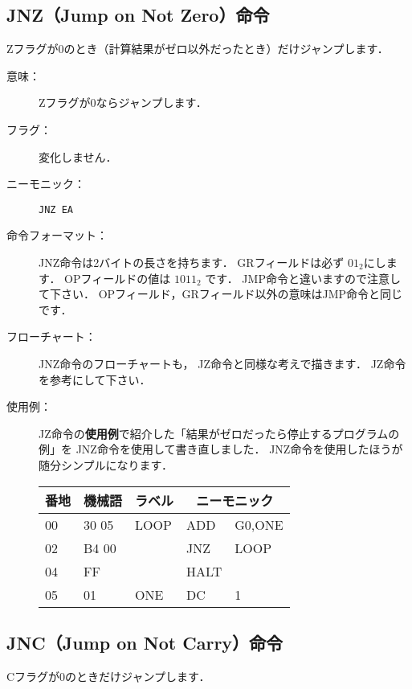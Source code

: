 \subsection{JNZ（Jump on Not Zero）命令}
Zフラグが0のとき（計算結果がゼロ以外だったとき）だけジャンプします．

\begin{description}
\item[意味：]Zフラグが0ならジャンプします．

\item[フラグ：]変化しません．

\item[ニーモニック：]{\tt JNZ  EA} 

\item[命令フォーマット：]JNZ命令は2バイトの長さを持ちます．
GRフィールドは必ず $01_2$にします．
OPフィールドの値は $1011_2$ です．
JMP命令と違いますので注意して下さい．
OPフィールド，GRフィールド以外の意味はJMP命令と同じです．


\item[フローチャート：]JNZ命令のフローチャートも，
JZ命令と同様な考えで描きます．
JZ命令を参考にして下さい．

\item[使用例：]
JZ命令の{\bf 使用例}で紹介した「結果がゼロだったら停止するプログラムの例」を
JNZ命令を使用して書き直しました．
JNZ命令を使用したほうが随分シンプルになります．

{\tt\small\begin{center}
\begin{tabular}{|l|l|l|l l|} \hline
番地 & 機械語 & ラベル & \multicolumn{2}{|c|}{ニーモニック} \\
\hline
00 & 30 05 & LOOP & ADD  & G0,ONE  \\
02 & B4 00 &      & JNZ  & LOOP    \\
04 & FF    &      & HALT &         \\
05 & 01    & ONE  & DC   & 1       \\
\hline
\end{tabular}
\end{center}}
\end{description}

\subsection{JNC（Jump on Not Carry）命令}
Cフラグが0のときだけジャンプします．

